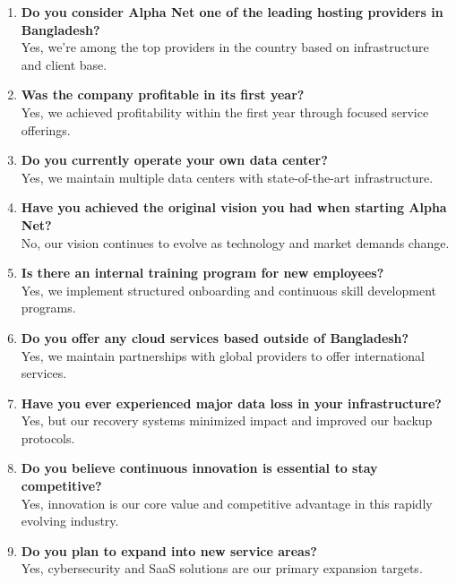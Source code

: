 \begin{enumerate}
    \item \textbf{Do you consider Alpha Net one of the leading hosting providers in Bangladesh?}\\
    Yes, we're among the top providers in the country based on infrastructure and client base.
    
    \item \textbf{Was the company profitable in its first year?}\\
    Yes, we achieved profitability within the first year through focused service offerings.
    
    \item \textbf{Do you currently operate your own data center?}\\
    Yes, we maintain multiple data centers with state-of-the-art infrastructure.
    
    \item \textbf{Have you achieved the original vision you had when starting Alpha Net?}\\
    No, our vision continues to evolve as technology and market demands change.
    
    \item \textbf{Is there an internal training program for new employees?}\\
    Yes, we implement structured onboarding and continuous skill development programs.
    
    \item \textbf{Do you offer any cloud services based outside of Bangladesh?}\\
    Yes, we maintain partnerships with global providers to offer international services.
    
    \item \textbf{Have you ever experienced major data loss in your infrastructure?}\\
    Yes, but our recovery systems minimized impact and improved our backup protocols.
    
    \item \textbf{Do you believe continuous innovation is essential to stay competitive?}\\
    Yes, innovation is our core value and competitive advantage in this rapidly evolving industry.
    
    \item \textbf{Do you plan to expand into new service areas?}\\
    Yes, cybersecurity and SaaS solutions are our primary expansion targets.
    

\end{enumerate}
